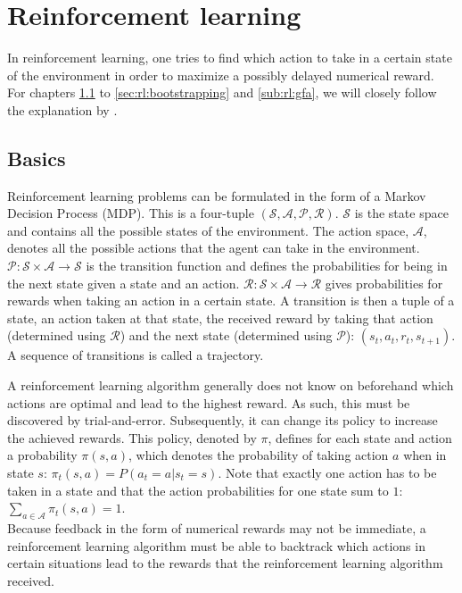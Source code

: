 \chapter{Reinforcement learning}
\label{cha:reinforcement_learning}
In reinforcement learning, one tries to find which action to take in a certain state of the environment in order to maximize a possibly delayed numerical reward.\\
For chapters \ref{sub:rl:basics} to \ref{sec:rl:bootstrapping} and \ref{sub:rl:gfa}, we will closely follow the explanation by \cite{Sutton1998ReinforcementIntroduction}.

\section{Basics}
\label{sub:rl:basics}
Reinforcement learning problems can be formulated in the form of a Markov Decision Process (MDP).
This is a four-tuple $(\mathcal{S}, \mathcal{A}, \mathcal{P}, \mathcal{R})$. $\mathcal{S}$ is the state space and contains all the possible states of the environment.
The action space, $\mathcal{A}$, denotes all the possible actions that the agent can take in the environment.
$\mathcal{P}: \mathcal{S} \times \mathcal{A} \to \mathcal{S}$ is the transition function and defines the probabilities for being in the next state given a state and an action.
$\mathcal{R}: \mathcal{S} \times \mathcal{A} \to \mathcal{R}$ gives probabilities for rewards when taking an action in a certain state.
A transition is then a tuple of a state, an action taken at that state, the received reward by taking that action (determined using $\mathcal{R}$) and the next state (determined using $\mathcal{P}$): $(s_t,a_t,r_t,s_{t+1})$.
A sequence of transitions is called a trajectory.

A reinforcement learning algorithm generally does not know on beforehand which actions are optimal and lead to the highest reward.
As such, this must be discovered by trial-and-error.
Subsequently, it can change its policy to increase the achieved rewards.
This policy, denoted by $\pi$, defines for each state and action a probability $\pi(s,a)$, which denotes the probability of taking action $a$ when in state $s$: $\pi_t(s,a) = P(a_t = a \vert s_t = s)$.
Note that exactly one action has to be taken in a state and that the action probabilities for one state sum to $1$: $\sum_{a\in \mathcal{A}}\pi_t(s,a)=1$.\\
Because feedback in the form of numerical rewards may not be immediate, a reinforcement learning algorithm must be able to backtrack which actions in certain situations lead to the rewards that the reinforcement learning algorithm received.\\

